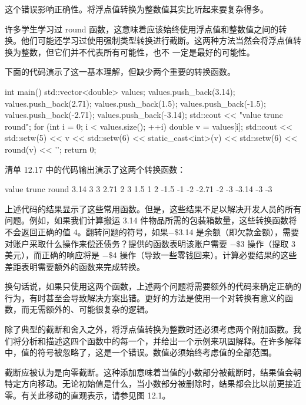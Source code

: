 这个错误影响正确性。将浮点值转换为整数值其实比听起来要复杂得多。


许多学生学习过 round 函数，这意味着应该始终使用浮点值和整数值之间的转换。他们可能还学习过使用强制类型转换进行截断。这两种方法当然会将浮点值转换为整数，但它们并不代表所有可能性，也不 一定是最好的可能性。

下面的代码演示了这一基本理解，但缺少两个重要的转换函数。


\begin{cpp}
int main() {
  std::vector<double> values;
  values.push_back(3.14); values.push_back(2.71); values.push_back(1.5);
  values.push_back(-1.5); values.push_back(-2.71);
  values.push_back(-3.14);
  std::cout << "value trunc round\n";
  for (int i = 0; i < values.size(); ++i) {
    double v = values[i];
    std::cout << std::setw(5) << v
      << std::setw(6) << static_cast<int>(v)
      << std::setw(6) << round(v)
      << '\n';
  }
  return 0;
}
\end{cpp}

清单 12.17 中的代码输出演示了这两个转换函数：

\begin{shell}
value trunc round
 3.14     3     3
 2.71     2     3
  1.5     1     2
 -1.5    -1    -2
-2.71    -2    -3
-3.14    -3    -3
\end{shell}


上述代码的结果显示了这些常用函数。但是，这些结果不足以解决开发人员的所有问题。例如，如果我们计算搬运 3.14 件物品所需的包装箱数量，这些转换函数将不会返回正确的值 4。翻转问题的符号，如果−\$3.14 是余额（即欠款金额），需要对账户采取什么操作来偿还债务？提供的函数表明该账户需要 −\$3 操作（提取 3 美元），而正确的响应将是 −\$4 操作（导致一些零钱回来）。计算必要结果的这些差距表明需要额外的函数来完成转换。

换句话说，如果只使用这两个函数，上述两个问题将需要额外的代码来确定正确的行为，有时甚至会导致解决方案出错。更好的方法是使用一个对转换有意义的函数，而无需额外的、可能很复杂的逻辑。


除了典型的截断和舍入之外，将浮点值转换为整数时还必须考虑两个附加函数。我们将分析和描述这四个函数中的每一个，并给出一个示例来巩固解释。在许多解释中，值的符号被忽略了，这是一个错误。数值必须始终考虑值的全部范围。

截断应被认为是向零截断。这种添加意味着当值的小数部分被截断时，结果值会朝特定方向移动。无论初始值是什么，当小数部分被删除时，结果都会比以前更接近零。有关此移动的直观表示，请参见图 12.1。

